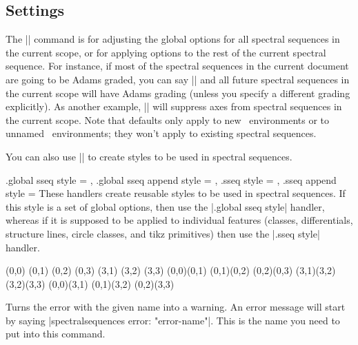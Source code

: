 \begin{sseqdata}[name = basic, cohomological Serre grading]
\subsection{Settings}
\begin{command}{\sseqset{}}
The |\sseqset| command is for adjusting the global options for all spectral sequences in the current scope, or for applying options to the rest of the current spectral sequence. For instance, if most of the spectral sequences in the current document are going to be Adams graded, you can say || and all future spectral sequences in the current scope will have Adams grading (unless you specify a different grading explicitly). As another example, || will suppress axes from spectral sequences in the current scope. Note that defaults only apply to new \sseqdataenv\ environments or to unnamed \sseqpageenv\ environments; they won't apply to existing spectral sequences.

You can also use |\sseqset| to create styles to be used in spectral sequences.
\begin{keylist}{
    .global sseq style = ,
    .global sseq append style = ,
    .sseq style = ,
    .sseq append style = 
}
These handlers create reusable styles to be used in spectral sequences. If this style is a set of global options, then use the |.global sseq style| handler, whereas if it is supposed to be applied to individual features (classes, differentials, structure lines, circle classes, and tikz primitives) then use the |.sseq style| handler.
\begin{codeexample}[width=6cm]
\begin{sseqpage}[ mysseq ]
\class(0,0) \class(0,1) \class(0,2) \class(0,3)
\class(3,1) \class(3,2) \class(3,3)
\structline(0,0)(0,1) \structline(0,1)(0,2)
\structline(0,2)(0,3)
\structline(3,1)(3,2) \structline(3,2)(3,3)
\structline[htwostruct](0,0)(3,1)
\structline[htwostruct](0,1)(3,2)
\structline[htwostruct](0,2)(3,3)
\end{sseqpage}
\end{codeexample}
\end{keylist}
\end{command}

\begin{command}{\SseqErrorToWarning{}}
Turns the error with the given name into a warning. An error message will start by saying \let\eatclnifpresent\empty|spectralsequences error: "error-name"|. This is the name you need to put into this command.
\end{command}


\end{sseqdata}

